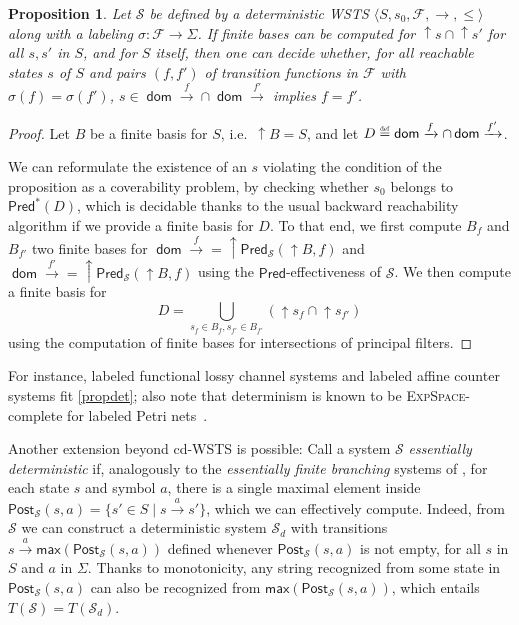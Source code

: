 \documentclass[11pt,reqno,a4paper]{amsart}
\newcommand{\eqdef}{\stackrel{\raisebox{-.15ex}{\scalebox{.5}{\upshape\textrm{def}}}}{=}}
\newcommand{\tup}[1]{\langle #1\rangle}
\newcommand{\uc}{\mathop{\uparrow}\!}
\newcommand{\ru}[1]{\xrightarrow{#1}}
\newcommand{\dom}{\mathop{\mathsf{dom}}}
\renewcommand{\cite}{\citep}
\theoremstyle{plain}
\newtheorem{proposition}[theorem]{Proposition}
\theoremstyle{definition}
\theoremstyle{remark}
\begin{document}
\begin{proposition}\label{propdet}
  Let $\mathcal{S}$ be defined by a deterministic WSTS
  $\tup{S,s_0,\mathcal{F},{\rightarrow},{\leq}}$ along with a labeling
  $\sigma: \mathcal{F}\rightarrow\Sigma$.  If finite bases can be
  computed for
  $\uc s\cap\uc s'$ for all $s,s'$ in $S$, and for
  $S$ itself,
  then one can decide whether, for all reachable states $s$ of $S$ and
  pairs $(f,f')$ of transition functions in $\mathcal{F}$ with
  $\sigma(f)=\sigma(f')$, $s\in\dom\ru{f}\cap\dom\ru{f'}$ implies
  $f=f'$.
\end{proposition}
\begin{proof}
  Let $B$ be a finite basis for $S$, i.e.\ $\uc B=S$, and let
  $D\eqdef\dom\ru{f}\cap\dom\ru{f'}$.

  We can reformulate the existence of an $s$ violating the condition
  of the proposition as a coverability problem, by checking whether $s_0$
  belongs to $\mathsf{Pred}^\ast(D)$, which is decidable thanks to the
  usual backward reachability algorithm if we provide a finite basis
  for $D$.  To that end, we first compute $B_f$ and $B_{f'}$ two
  finite bases for ${\dom\ru{f}}=\uc\mathsf{Pred}_\mathcal{S}(\uc
  B,f)$ and ${\dom\ru{f'}}=\uc\mathsf{Pred}_\mathcal{S}(\uc B,f)$
  using the $\mathsf{Pred}$-effectiveness of $\mathcal{S}$.  We then
  compute a finite basis for
  \begin{equation}\label{eq-bff}
    D = \bigcup_{s_f\in B_f,s_{f'}\in B_{f'}}(\uc s_f \cap\uc s_{f'})
  \end{equation}
  using the computation of finite bases for intersections of principal
  filters.
\end{proof}
\noindent For instance, labeled functional lossy channel systems and
labeled affine counter systems fit \autoref{propdet}; also note that
determinism is known to be \textsc{ExpSpace}-complete for labeled
Petri nets~\cite{yen,Schmitz11}.

Another extension beyond cd-WSTS is possible: Call a system $\mathcal{S}$
\emph{essentially deterministic} if, analogously to the
\emph{essentially finite branching} systems of \citet{wqo}, for each
state $s$ and symbol $a$, there is a single maximal element inside
$\mathsf{Post}_{\mathcal{S}}(s,a)=\{s'\in S\mid s\ru{a}s'\}$, which we
can effectively compute.  Indeed, from $\mathcal{S}$ we can construct a
deterministic system $\mathcal{S}_d$ with transitions
$s\ru{a}\mathsf{max}(\mathsf{Post}_{\mathcal{S}}(s,a))$ defined whenever
$\mathsf{Post}_{\mathcal{S}}(s,a)$ is not empty, for all $s$ in $S$ and
$a$ in $\Sigma$.  Thanks to monotonicity, any string recognized from
some state in $\mathsf{Post}_{\mathcal{S}}(s,a)$ can also be recognized
from $\mathsf{max}(\mathsf{Post}_{\mathcal{S}}(s,a))$, which entails
$T(\mathcal{S})=T(\mathcal{S}_d)$.
\end{document}
